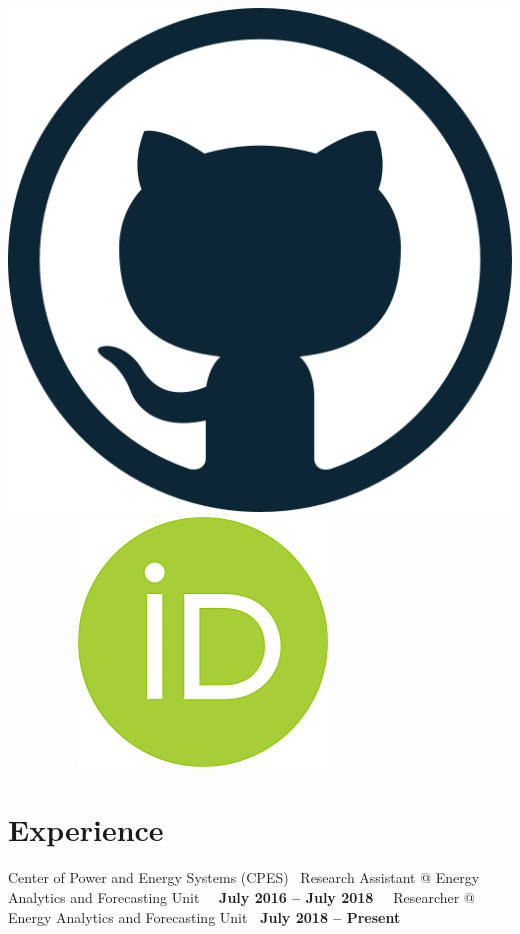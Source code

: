 \documentclass{mycv}
\begin{document}
\begin{center}
	\href{https://github.com/jrsa2012}{\includegraphics[scale=0.052]{figs/github_logo.png}}
	\ \ \ \ \ \ \ \ \ \
	\href{https://orcid.org/0000-0001-8170-8235}{\includegraphics[scale=0.103]{figs/orcid_logo.png}}
	
\end{center}



\section{Experience}

\vspace{0.3cm}

{Center of Power and Energy Systems (CPES) }
{\textbullet~Research Assistant \hspace{0.005cm} @ \hspace{0.02cm} Energy Analytics and Forecasting Unit \hfill ~\textbf{\ July 2016 -- July 2018\ }}
{\textbullet~Researcher \hspace{1.23cm}  @ \hspace{0.02cm} Energy Analytics and Forecasting Unit \hfill \textbf{ \ July 2018 -- Present\ }}
\end{document}
